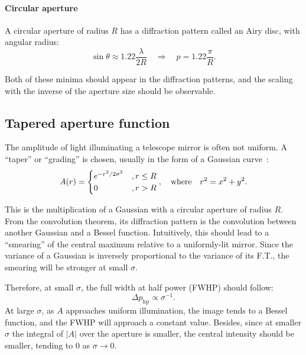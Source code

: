 \documentclass[11pt]{article}
\newcommand{\R}[1]{\mathrm{#1}}
\begin{document}
\paragraph{Circular aperture} A circular aperture of radius $R$ has a diffraction pattern called an Airy disc, with angular radius:
\begin{equation}\label{eqn:test_circ}
    \sin{\theta} \approx 1.22 \frac{\lambda}{2R} \quad \Rightarrow \quad p = 1.22 \frac{\pi}{R}.
\end{equation}

Both of these minima should appear in the diffraction patterns, and the scaling with the inverse of the aperture size should be observable.

\subsection{Tapered aperture function}\label{sec:analysis:taper}
The amplitude of light illuminating a telescope mirror is often not uniform. A ``taper'' or ``grading'' is chosen, usually in the form of a Gaussian curve~\cite[Section~6.4]{RadioAstro}:
\begin{equation}
    A(r) = \begin{cases}
        e ^ {-r^2 / {2 \sigma^2}} &, r \leq R\\
        0 &, r > R
    \end{cases}, \qq{where} r^2 = x^2 + y^2.
\end{equation}

This is the multiplication of a Gaussian with a circular aperture of radius $R$. From the convolution theorem, its diffraction pattern is the convolution between another Gaussian and a Bessel function. Intuitively, this should lead to a ``smearing'' of the central maximum relative to a uniformly-lit mirror. Since the variance of a Gaussian is inversely proportional to the variance of its F.T., the smearing will be stronger at small $\sigma$.

Therefore, at small $\sigma$, the full width at half power (FWHP) should follow:
\begin{equation}
    \Delta p_{\R{hp}} \propto \sigma^{-1}.
\end{equation}
At large $\sigma$, as $A$ approaches uniform illumination, the image tends to a Bessel function, and the FWHP will approach a constant value. Besides, since at smaller $\sigma$ the integral of $|A|$ over the aperture is smaller, the central intensity should be smaller, tending to 0 as $\sigma \rightarrow 0$.
\end{document}
